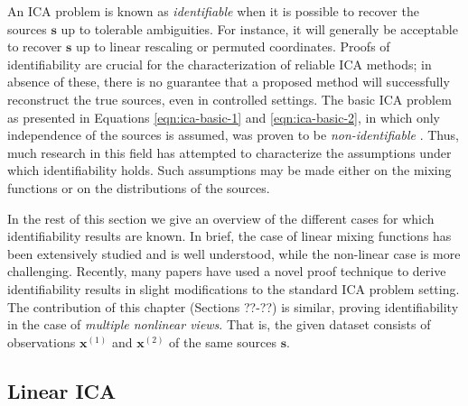 An ICA problem is known as \emph{identifiable} when it is possible to recover the sources $\bm{s}$ up to tolerable ambiguities. 
For instance, it will generally be acceptable to recover $\bm{s}$ up to linear rescaling or permuted coordinates.
Proofs of identifiability are crucial for the characterization of reliable ICA methods; in absence of these, there is no guarantee that a proposed method will successfully reconstruct the true sources, even in controlled settings.
The basic ICA problem as presented in Equations \ref{eqn:ica-basic-1} and \ref{eqn:ica-basic-2}, in which only independence of the sources is assumed, was proven to be \emph{non-identifiable} \citep{hyvarinen1999nonlinear}.
Thus, much research in this field has attempted to characterize the assumptions under which identifiability holds.
Such assumptions may be made either on the mixing functions or on the distributions of the sources. 

In the rest of this section we give an overview of the different cases for which identifiability results are known. 
In brief, the case of linear mixing functions has been extensively studied and is well understood, while the non-linear case is more challenging.
Recently, many papers have used a novel proof technique to derive identifiability results in slight modifications to the standard ICA problem setting.
The contribution of this chapter (Sections ??-??) is similar, proving identifiability in the case of \emph{multiple nonlinear views}. 
That is, the given dataset consists of observations $\bm{x}^{(1)}$ and $\bm{x}^{(2)}$ of the same sources $\bm{s}$.



\subsection{Linear ICA}



